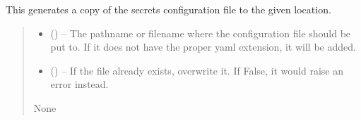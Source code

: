 \documentclass[letterpaper,11pt,english]{sphinxmanual}
\begin{document}

\begin{savenotes}\begin{fulllineitems}
\label{\detokenize{code/opihiexarata.library.config:opihiexarata.library.config.generate_secrets_file_copy}}
\pysigstartsignatures
{}
\pysigstopsignatures
\sphinxAtStartPar
This generates a copy of the secrets configuration file to the given
location.
\begin{quote}\begin{description}
\begin{itemize}
\item {} 
\sphinxAtStartPar
{} () – The pathname or filename where the configuration file should be put
to. If it does not have the proper yaml extension, it will be added.

\item {} 
\sphinxAtStartPar
{} (\sphinxstyleliteralemphasis{\sphinxupquote{, }}) – If the file already exists, overwrite it. If False, it would raise
an error instead.

\end{itemize}

\sphinxAtStartPar
None

\end{description}\end{quote}

\end{fulllineitems}\end{savenotes}

\end{document}
